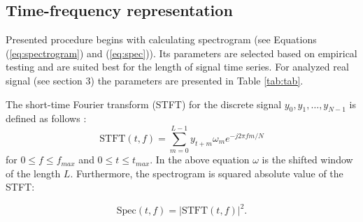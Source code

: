 \documentclass[11pt]{article}
\begin{document}
\subsection{Time-frequency representation}
Presented procedure begins with calculating spectrogram (see Equations (\ref{eq:spectrogram}) and (\ref{eq:spec})). Its parameters are selected based on empirical testing and are suited best for the length of signal time series. For analyzed real signal (see section 3) the parameters are presented in Table \ref{tab:tab}.

The short-time Fourier transform (STFT) for the discrete signal $y_0, y_1, \dots , y_{N-1}$ is defined as follows \cite{oppenheim1999discrete}:
\begin{equation}
\label{eq:spectrogram}
\textrm{STFT}(t,f)=\sum_{m=0}^{L-1} y_{t+m}\omega_{m}e^{-j2\pi fm/N}
\end{equation}
for $0\leq f\leq f_{max}$ and $0\leq t\leq t_{max}$. In the above equation $\omega$ is the shifted window of the length $L$. Furthermore, the spectrogram is squared absolute value of the STFT:

\begin{equation}
\label{eq:spec}
\textrm{Spec}(t,f)=|\textrm{STFT}(t,f)|^2.
\end{equation}
\end{document}
